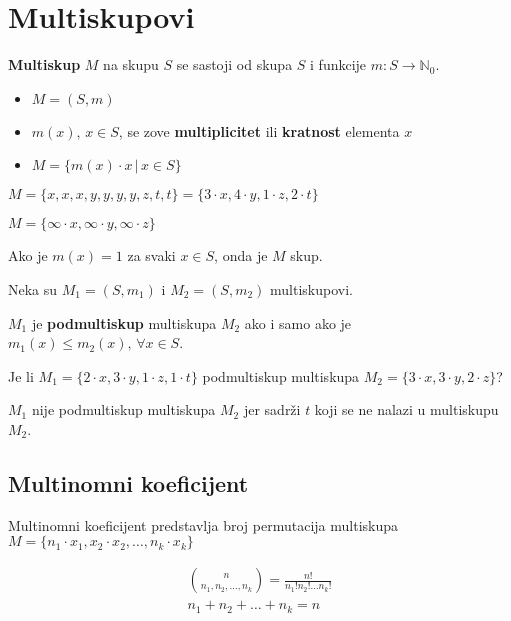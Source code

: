 \section{Multiskupovi}

\textbf{Multiskup} $M$ na skupu $S$ se sastoji od skupa $S$ i funkcije
$m: S\to\mathbb{N}_0$.

\begin{itemize}
    \item $M = (S, m)$
    \item $m(x),\, x\in S$, se zove \textbf{multiplicitet} ili \textbf{kratnost} elementa $x$
    \item $M = \{m(x) \cdot x \,|\, x \in S\}$
\end{itemize}

\begin{example}
    $M = \{x,x,x,y,y,y,y,z,t,t\} = \{3\cdot x, 4 \cdot y, 1 \cdot z, 2 \cdot t\}$
\end{example}

\begin{example}
    $M = \{\infty \cdot x, \infty \cdot y, \infty \cdot z\}$
\end{example}

Ako je $m(x) = 1$ za svaki $x\in S$, onda je $M$ skup.

\bigskip
Neka su $M_1 = (S, m_1)$ i $M_2 = (S, m_2)$ multiskupovi.

$M_1$ je \textbf{podmultiskup} multiskupa $M_2$ ako i samo ako je $m_1(x) \leq m_2(x),\, \forall x \in S$.

\begin{example}
    Je li $M_1 = \{2\cdot x, 3 \cdot y, 1 \cdot z, 1 \cdot t\}$ podmultiskup
    multiskupa $M_2 = \{3\cdot x, 3 \cdot y, 2 \cdot z\}$?
\end{example}

$M_1$ nije podmultiskup multiskupa $M_2$ jer sadrži $t$ koji se ne nalazi u
multiskupu $M_2$.

\subsection{Multinomni koeficijent}

Multinomni koeficijent predstavlja broj permutacija multiskupa $M = \{n_1\cdot x_1, x_2 \cdot x_2, \dots, n_k \cdot x_k\}$

\begin{gather*}
    \binom{n}{n_1, n_2, \dots, n_k} = \frac{n!}{n_1!n_2!\dots n_k!}\\
    n_1+n_2+\dots+n_k = n
\end{gather*}

